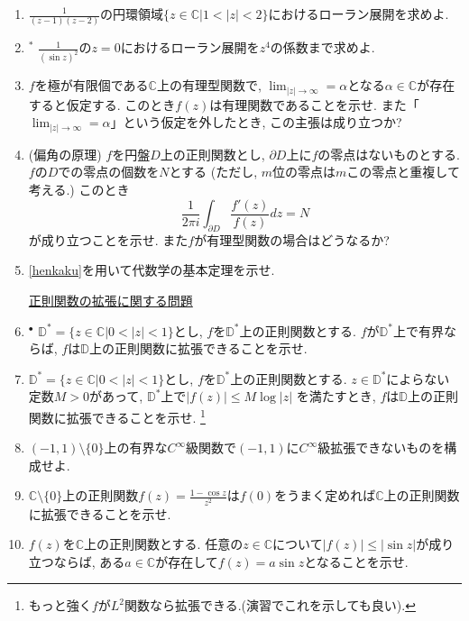 \documentclass[dvipdfmx,a4paper,11pt]{article}
\newcommand{\C}{\mathbb{C}}
\newcommand{\D}{\mathbb{D}}
\theoremstyle{definition}
\begin{document}
\begin{enumerate}[label=\textbf{問}4.\arabic*]
\item $\frac{1}{(z-1)(z-2)}$の円環領域$\{ z\in \C | 1 < |z| < 2\}$におけるローラン展開を求めよ.

\item  $^{*}$ $\frac{1}{(\sin z)^2}$の$z=0$におけるローラン展開を$z^4$の係数まで求めよ.

 \item $f$を極が有限個である$\C$上の有理型関数で, $\lim_{|z| \rightarrow \infty} = \alpha $となる$\alpha \in \C$が存在すると仮定する. このとき$f(z)$は有理関数であることを示せ.
   また「$\lim_{|z| \rightarrow \infty} = \alpha $」という仮定を外したとき, この主張は成り立つか?
       
  \item \label{henkaku} (偏角の原理) $f$を円盤$D$上の正則関数とし, $\partial D$上に$f$の零点はないものとする. 
  $f$の$D$での零点の個数を$N$とする (ただし, $m$位の零点は$m$この零点と重複して考える.)
  このとき
  $$
  \frac{1}{2 \pi i} \int_{\partial D} \frac{f' (z)}{f(z)} dz = N
  $$
  が成り立つことを示せ. また$f$が有理型関数の場合はどうなるか?
  \item \ref{henkaku}を用いて代数学の基本定理を示せ.
  
\vspace{12pt}
\hspace{-36pt}\underline{正則関数の拡張に関する問題}



 \item $^{\bullet}$  $\D^{*}=\{z \in \C | 0 < |z| <1\}$とし, $f$を$\D^{*}$上の正則関数とする. 
 $f$が$\D^{*}$上で有界ならば, $f$は$\D$上の正則関数に拡張できることを示せ. 
 
  \item $\D^{*}=\{z \in \C | 0 < |z| <1\}$とし, 
  $f$を$\D^{*}$上の正則関数とする. 
 $z \in \D^{*}$によらない定数$M>0$があって, $\D^{*}$上で$|f(z)| \le M \log |z|$
 を満たすとき, $f$は$\D$上の正則関数に拡張できることを示せ. \footnote{もっと強く$f$が$L^2$関数なら拡張できる.(演習でこれを示しても良い).}
 
 
 \item $(-1,1) \setminus \{ 0\}$上の有界な$C^{\infty}$級関数で$(-1,1)$に$C^{\infty}$級拡張できないものを構成せよ. 
 
  \item $\C \setminus \{ 0\}$上の正則関数$f(z)=\frac{1 - \cos z}{z^2}$は$f(0)$をうまく定めれば$\C$上の正則関数に拡張できることを示せ. 
  
 \item $f(z)$を$\C$上の正則関数とする. 任意の$z \in \C$について$|f(z)| \le |\sin z|$が成り立つならば, ある$a \in \C$が存在して$f(z) = a \sin z$となることを示せ. 
 



\end{enumerate}
\end{document}
